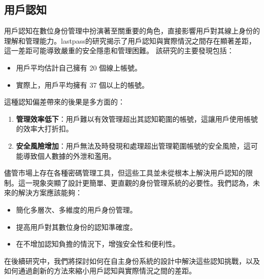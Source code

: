 \subsection{用戶認知}
用戶認知在數位身份管理中扮演著至關重要的角色，直接影響用戶對其線上身份的理解和管理能力。lastpass\cite{lastpass2020psychology}的研究揭示了用戶認知與實際情況之間存在顯著差距，這一差距可能導致嚴重的安全隱患和管理困難。\newline
該研究的主要發現包括：
\begin{itemize}
  \item 用戶平均估計自己擁有 20 個線上帳號。
  \item 實際上，用戶平均擁有 37 個以上的帳號。
\end{itemize}
這種認知偏差帶來的後果是多方面的：
\begin{enumerate}
  \item \textbf{管理效率低下}：用戶難以有效管理超出其認知範圍的帳號，這讓用戶使用帳號的效率大打折扣。
  \item \textbf{安全風險增加}：用戶無法及時發現和處理超出管理範圍帳號的安全風險，這可能導致個人數據的外泄和濫用。
\end{enumerate}
儘管市場上存在各種密碼管理工具，但這些工具並未從根本上解決用戶認知的限制。這一現象突顯了設計更簡單、更直觀的身份管理系統的必要性。我們認為，未來的解決方案應該能夠：
\begin{itemize}
  \item 簡化多層次、多維度的用戶身份管理。
  \item 提高用戶對其數位身份的認知準確度。
  \item 在不增加認知負擔的情況下，增強安全性和便利性。
\end{itemize}
在後續研究中，我們將探討如何在自主身份系統的設計中解決這些認知挑戰，以及如何通過創新的方法來縮小用戶認知與實際情況之間的差距。
